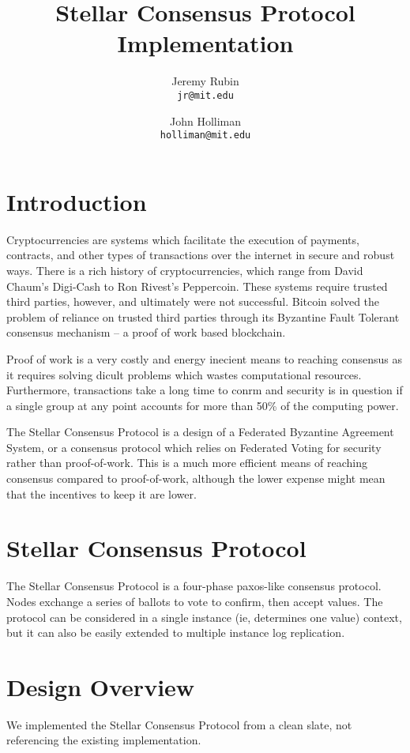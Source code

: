 \documentclass[preprint,11pt]{article}
\title{Stellar Consensus Protocol Implementation}
\author{Jeremy Rubin\\
  \texttt{jr@mit.edu}
  \and
  John Holliman\\
  \texttt{holliman@mit.edu}
}
\begin{document}
\maketitle
{}
\setlength{\pdfpageheight}{\paperheight}
\setlength{\pdfpagewidth}{\paperwidth}

\section{Introduction}
Cryptocurrencies are systems which facilitate the execution of
payments, contracts, and other types of transactions over the internet
in secure and robust ways. There is a rich history of
cryptocurrencies, which range from David Chaum's Digi-Cash to Ron
Rivest's Peppercoin. These systems require trusted third parties,
however, and ultimately were not successful. Bitcoin solved the
problem of reliance on trusted third parties through its Byzantine
Fault Tolerant consensus mechanism -- a proof of work based
blockchain.

Proof of work is a very costly and energy inecient means to reaching
consensus as it requires solving dicult problems which wastes
computational resources.  Furthermore, transactions take a long time
to conrm and security is in question if a single group at any point
accounts for more than 50\% of the computing power.

The Stellar Consensus Protocol is a design of a Federated Byzantine
Agreement System, or a consensus protocol which relies on Federated
Voting for security rather than proof-of-work. This is a much more
efficient means of reaching consensus compared to proof-of-work, although
the lower expense might mean that the incentives to keep it are lower.



\section{Stellar Consensus Protocol}
The Stellar Consensus Protocol is a four-phase paxos-like consensus
protocol. Nodes exchange a series of ballots to vote to confirm, then
accept values. The protocol can be considered in a single instance
(ie, determines one value) context, but it can also be easily extended
to multiple instance log replication.




\section{Design Overview}
We implemented the Stellar Consensus Protocol from a clean slate, not
referencing the existing implementation.
\end{document}
